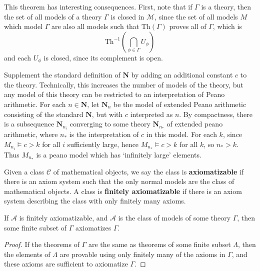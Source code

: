 This theorem has interesting consequences. First, note that if $\Gamma$ is a theory, then the set of all models of a theory $\Gamma$ is closed in $\mathcal{M}$, since the set of all models $M$ which model $\Gamma$ are also all models such that $\text{Th}(\Gamma)$ proves all of $\Gamma$, which is
%
\[ \text{Th}^{-1} \left(\bigcap_{\phi \in \Gamma} U_\phi \right) \]
%
and each $U_\phi$ is closed, since its complement is open.

\begin{example}
    Supplement the standard definition of $\mathbf{N}$ by adding an additional constant $c$ to the theory. Technically, this increases the number of models of the theory, but any model of this theory can be restricted to an interpretation of Peano arithmetic. For each $n \in \mathbf{N}$, let $\mathbf{N}_n$ be the model of extended Peano arithmetic consisting of the standard $\mathbf{N}$, but with $c$ interpreted as $n$. By compactness, there is a subsequence $\mathbf{N}_{n_i}$ converging to some theory $\mathbf{N}_{n_*}$ of extended peano arithmetic, where $n_*$ is the interpretation of $c$ in this model. For each $k$, since $M_{n_i} \vDash c > k$ for all $i$ sufficiently large, hence $M_{n_*} \vDash c > k$ for all $k$, so $n_* > k$. Thus $M_{n_*}$ is a peano model which has `infinitely large' elements.
\end{example}

Given a class $\mathcal{C}$ of mathematical objects, we say the class is {\bf axiomatizable} if there is an axiom system such that the only normal models are the class of mathematical objects. A class is {\bf finitely axiomatizable} if there is an axiom system describing the class with only finitely many axioms.

\begin{theorem}
    If $\mathcal{A}$ is finitely axiomatizable, and $\mathcal{A}$ is the class of models of some theory $\Gamma$, then some finite subset of $\Gamma$ axiomatizes $\Gamma$.
\end{theorem}
\begin{proof}
    If the theorems of $\Gamma$ are the same as theorems of some finite subset $\Lambda$, then the elements of $\Lambda$ are provable using only finitely many of the axioms in $\Gamma$, and these axioms are sufficient to axiomatize $\Gamma$.
\end{proof}

